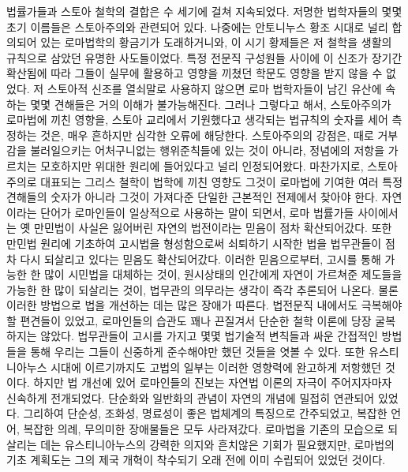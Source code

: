 법률가들과 스토아 철학의 결합은 수 세기에 걸쳐 지속되었다.
저명한 법학자들의 몇몇 초기 이름들은 스토아주의와 관련되어 있다.
나중에는 안토니누스 황조 시대로 널리 합의되어 있는
로마법학의 황금기가 도래하거니와,
이 시기 황제들은 저 철학을 생활의 규칙으로 삼았던 유명한 사도들이었다.
특정 전문직 구성원들 사이에 이 신조가 장기간 확산됨에 따라
그들이 실무에 활용하고 영향을 끼쳤던 학문도 영향을 받지 않을 수 없었다.
저 스토아적 신조를 열쇠말로 사용하지 않으면
로마 법학자들이 남긴 유산에 속하는 몇몇 견해들은 거의 이해가 불가능해진다.
그러나 그렇다고 해서,
스토아주의가 로마법에 끼친 영향을,
스토아 교리에서 기원했다고 생각되는 법규칙의 숫자를 세어 측정하는 것은,
매우 흔하지만 심각한 오류에 해당한다.
스토아주의의 강점은,
때로 거부감을 불러일으키는 어처구니없는 행위준칙들에 있는 것이 아니라,
정념에의 저항을 가르치는 모호하지만 위대한 원리에 들어있다고 널리 인정되어왔다.
마찬가지로, 스토아주의로 대표되는 그리스 철학이 법학에 끼친 영향도
그것이 로마법에 기여한 여러 특정 견해들의 숫자가 아니라
그것이 가져다준 단일한 근본적인 전제에서 찾아야 한다.
자연이라는 단어가 로마인들이 일상적으로 사용하는 말이 되면서,
로마 법률가들 사이에서는
옛 만민법이 사실은 잃어버린 자연의 법전이라는 믿음이
점차 확산되어갔다.
또한 만민법 원리에 기초하여 고시법을 형성함으로써
쇠퇴하기 시작한 법을 법무관들이 점차 다시 되살리고 있다는 믿음도 확산되어갔다.
이러한 믿음으로부터,
고시를 통해 가능한 한 많이 시민법을 대체하는 것이,
원시상태의 인간에게 자연이 가르쳐준 제도들을 가능한 한 많이 되살리는 것이,
법무관의 의무라는 생각이 즉각 추론되어 나온다.
물론 이러한 방법으로 법을 개선하는 데는 많은 장애가 따른다.
법전문직 내에서도 극복해야할 편견들이 있었고,
로마인들의 습관도 꽤나 끈질겨서 단순한 철학 이론에 당장 굴복하지는 않았다.
법무관들이 고시를 가지고 몇몇 법기술적 변칙들과 싸운 간접적인 방법들을 통해
우리는 그들이 신중하게 준수해야만 했던 것들을 엿볼 수 있다.
또한 유스티니아누스 시대에 이르기까지도 고법의 일부는
이러한 영향력에 완고하게 저항했던 것이다.
하지만 법 개선에 있어 로마인들의 진보는
자연법 이론의 자극이 주어지자마자 신속하게 전개되었다.
단순화와 일반화의 관념이 자연의 개념에 밀접히 연관되어 있었다.
그리하여 단순성, 조화성, 명료성이 좋은 법체계의 특징으로 간주되었고,
복잡한 언어, 복잡한 의례, 무의미한 장애물들은
모두 사라져갔다.
로마법을 기존의 모습으로 되살리는 데는
유스티니아누스의 강력한 의지와 흔치않은 기회가 필요했지만,
로마법의 기초 계획도는 그의 제국 개혁이 착수되기 오래 전에
이미 수립되어 있었던 것이다.

